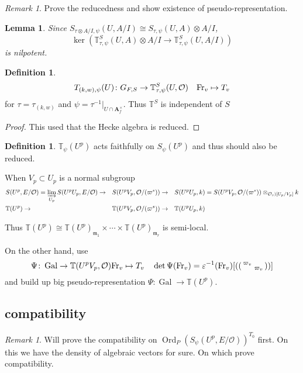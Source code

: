 \documentclass[leqno]{amsart}
\newcommand{\smat}[1]{\left( \begin{smallmatrix} #1 \end{smallmatrix} \right)}
\newcommand{\Fr}{\textnormal{Fr}} %
\DeclareMathOperator{\Ord}{Ord}
\newcommand{\A}{\mathbf A}
\DeclareMathOperator{\Gal}{Gal}
\newcommand{\oo}{\mathcal O}
\newcommand{\TT}{\mathbb{T}}
\newcommand{\1}{\mathbf{1}}
\newcommand{\fm}{\mathfrak m}
\newtheorem{lem}[thm]{Lemma}
\theoremstyle{definition}
\newtheorem{defn}[thm]{Definition}
\theoremstyle{remark}
\newtheorem{rem}[thm]{Remark}
\begin{document}
\begin{rem}
	Prove the reducedness and show existence of 
	pseudo-representation.
	\cite[Prop 2.27]{ger}
\end{rem}



\begin{lem}
	Since 
 $S_{\tau\otimes A/I, \psi}(U, A/I)\cong S_{\tau, \psi}(U, A)\otimes A/I$,
 \[
	 \ker(\TT_{\tau,\psi}^S(U,A)\otimes A/I\to \TT_{\tau,\psi}^S(U,A/I))
 \]
 is nilpotent.
\end{lem}

\begin{defn}
	\[
		T_{(k,w),\psi}(U)\colon G_{F,S}\to \TT^S_{\tau,\psi}
		(U,\oo)\quad
		\Fr_v\mapsto T_v
	\]
	for $\tau=\tau_{(k,w)}$
	and $\psi=\tau^{-1}\vert_{U\cap \A_f^\times}$.
	Thus  $\TT^S$ is independent of  $S$
\end{defn}
\begin{proof}
	This used that the Hecke algebra is reduced.
\end{proof}

\begin{defn}
	$\TT_\psi(U^p)$ acts faithfully on  $S_\psi(U^p)$
	and thus should also be reduced.
\end{defn}

When $V_p\subset U_p$ is a normal subgroup
\begin{align*}
&S(U^p,E/\oo)=\varinjlim_{U_p} S(U^pU_p, E/\oo)\to&
&S(U^pV_p,\oo/(\varpi^s))\to&
&S(U^pU_p,k)=
S(U^pV_p,\oo/(\varpi^s))\otimes_{\oo_s)[U_p/V_p]}k\\
&\TT(U^p)\to&
&\TT(U^pV_p,\oo/(\varpi^s))\to&
&\TT(U^pU_p,k)
\end{align*}

Thus
$\TT(U^p)\cong\TT(U^p)_{\fm_1}\times\cdots
\times \TT(U^p)_{\fm_r}$
is semi-local.

On the other hand, use
\[
	\Psi\colon \Gal\to \TT(U^pV_p,\oo)
	\Fr_v\mapsto T_v\quad
	\det\Psi(\Fr_v)=\varepsilon^{-1}(\Fr_v)
	[(\smat{\varpi_v&\\&\varpi_v})]
\]
and build up big pseudo-representation
$\Psi\colon \Gal\to \TT(U^p)$.

\subsection{compatibility}


\begin{rem}
	Will prove the compatibility on 
	$\Ord_P(S_\psi(U^p,E/\oo))^{T_0}$ first.
	On this we have the density of 
	algebraic vectors for sure.
	On which prove compatibility. 
\end{rem}
\end{document}
